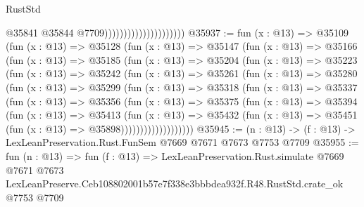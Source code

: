 \begin{lexlean}{RustStd}
\begin{coremodule}
                                              @35841
                                              @35844
                                              @7709)))))))))))))))))))))
@35937 := fun (x : @13) =>
  @35109
    (fun (x : @13) =>
    @35128
      (fun (x : @13) =>
      @35147
        (fun (x : @13) =>
        @35166
          (fun (x : @13) =>
          @35185
            (fun (x : @13) =>
            @35204
              (fun (x : @13) =>
              @35223
                (fun (x : @13) =>
                @35242
                  (fun (x : @13) =>
                  @35261
                    (fun (x : @13) =>
                    @35280
                      (fun (x : @13) =>
                      @35299
                        (fun (x : @13) =>
                        @35318
                          (fun (x : @13) =>
                          @35337
                            (fun (x : @13) =>
                            @35356
                              (fun (x : @13) =>
                              @35375
                                (fun (x : @13) =>
                                @35394
                                  (fun (x : @13) =>
                                  @35413
                                    (fun (x : @13) =>
                                    @35432
                                      (fun (x : @13) =>
                                      @35451 (fun (x : @13) => @35898)))))))))))))))))))
@35945 := (n : @13) -> (f : @13) -> LexLeanPreservation.Rust.FunSem @7669 @7671 @7673 @7753 @7709
@35955 := fun (n : @13) =>
  fun (f : @13) =>
  LexLeanPreservation.Rust.simulate
    @7669
    @7671
    @7673
    LexLeanPreserve.Ceb108802001b57e7f338e3bbbdea932f.R48.RustStd.crate_ok
    @7753
    @7709
\end{coremodule}
\end{lexlean}
